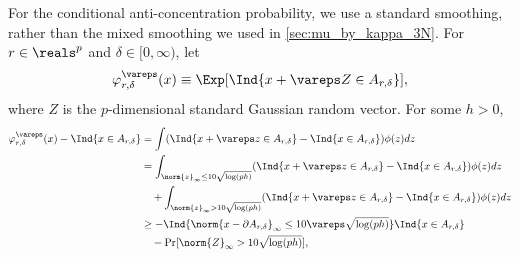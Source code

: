 \documentclass[aos]{imsart}
\begin{document}
\medskip
{} 
For the conditional anti-concentration probability, we use a standard smoothing, rather than the mixed smoothing we used in \cref{sec:mu_by_kappa_3N}.
For $r \in \reals^p$ and $\delta \in [0, \infty)$, let
\begin{equation*}
    \varphi_{r,\delta}^\vareps(x) \equiv \Exp[ \Ind\{x + \vareps Z \in A_{r,\delta}\} ],
\end{equation*}
where $Z$ is the $p$-dimensional standard Gaussian random vector.
For some $h > 0$,
\begin{equation*}
\begin{aligned}
    \varphi_{r,\delta}^\vareps(x) - \Ind\{x \in A_{r,\delta}\}
    & = \int (\Ind\{x + \vareps z \in A_{r,\delta}\} - \Ind\{x \in A_{r,\delta}\}) \phi(z) dz \\
    & = \int_{\norm{z}_\infty \leq 10\sqrt{\log(ph)}} (\Ind\{x + \vareps z \in A_{r,\delta}\} - \Ind\{x \in A_{r,\delta}\}) \phi(z) dz \\ 
    & \quad + \int_{\norm{z}_\infty > 10\sqrt{\log(ph)}} (\Ind\{x + \vareps z \in A_{r,\delta}\} - \Ind\{x \in A_{r,\delta}\}) \phi(z) dz \\
    & \geq - \Ind\{\norm{x - \partial A_{r,\delta}}_\infty \leq 10 \vareps \sqrt{\log(ph)}\}
    \Ind\{x \in A_{r,\delta}\} \\
    & \quad - \Pr[\norm{Z}_\infty > 10 \sqrt{\log(ph)}],
\end{aligned}
\end{equation*}
\end{document}
